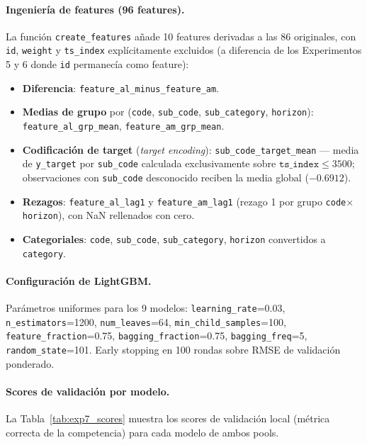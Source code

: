 \documentclass{article}
\begin{document}
\paragraph{Ingeniería de features (96 features).}
La función \texttt{create\_features} añade 10 features derivadas a las 86 originales, con \texttt{id}, \texttt{weight} y \texttt{ts\_index} explícitamente excluidos (a diferencia de los Experimentos 5 y 6 donde \texttt{id} permanecía como feature):
\begin{itemize}
    \item \textbf{Diferencia}: \texttt{feature\_al\_minus\_feature\_am}.
    \item \textbf{Medias de grupo} por (\texttt{code}, \texttt{sub\_code}, \texttt{sub\_category}, \texttt{horizon}): \texttt{feature\_al\_grp\_mean}, \texttt{feature\_am\_grp\_mean}.
    \item \textbf{Codificación de target} (\emph{target encoding}): \texttt{sub\_code\_target\_mean} — media de \texttt{y\_target} por \texttt{sub\_code} calculada exclusivamente sobre $\texttt{ts\_index} \leq 3500$; observaciones con \texttt{sub\_code} desconocido reciben la media global ($-0.6912$).
    \item \textbf{Rezagos}: \texttt{feature\_al\_lag1} y \texttt{feature\_am\_lag1} (rezago 1 por grupo \texttt{code}$\times$\texttt{horizon}), con NaN rellenados con cero.
    \item \textbf{Categoriales}: \texttt{code}, \texttt{sub\_code}, \texttt{sub\_category}, \texttt{horizon} convertidos a \texttt{category}.
\end{itemize}

\paragraph{Configuración de LightGBM.}
Parámetros uniformes para los 9 modelos: \texttt{learning\_rate}=0.03, \texttt{n\_estimators}=1200, \texttt{num\_leaves}=64, \texttt{min\_child\_samples}=100, \texttt{feature\_fraction}=0.75, \texttt{bagging\_fraction}=0.75, \texttt{bagging\_freq}=5, \texttt{random\_state}=101. Early stopping en 100 rondas sobre RMSE de validación ponderado.

\paragraph{Scores de validación por modelo.}
La Tabla~\ref{tab:exp7_scores} muestra los scores de validación local (métrica correcta de la competencia) para cada modelo de ambos pools.
\end{document}
